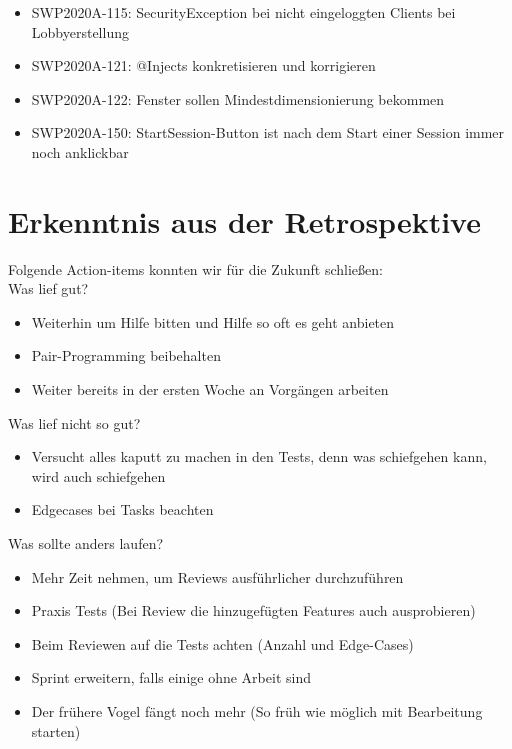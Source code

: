 \documentclass[12pt,a4paper, oneside]{article}
\begin{document}
    \begin{itemize}
        \item SWP2020A-115: SecurityException bei nicht eingeloggten Clients bei Lobbyerstellung
        \item SWP2020A-121: @Injects konkretisieren und korrigieren
        \item SWP2020A-122: Fenster sollen Mindestdimensionierung bekommen
        \item SWP2020A-150: StartSession-Button ist nach dem Start einer Session immer noch anklickbar
    \end{itemize}


    \section{Erkenntnis aus der Retrospektive}
    Folgende Action-items konnten wir für die Zukunft schließen:\\

    Was lief gut?
    \begin{itemize}
        \item Weiterhin um Hilfe bitten und Hilfe so oft es geht anbieten
        \item Pair-Programming beibehalten
        \item Weiter bereits in der ersten Woche an Vorgängen arbeiten
        \\
    \end{itemize}

    Was lief nicht so gut?
    \begin{itemize}
        \item Versucht alles kaputt zu machen in den Tests, denn was schiefgehen kann, wird auch schiefgehen
        \item Edgecases bei Tasks beachten
        \\
    \end{itemize}

    Was sollte anders laufen?
    \begin{itemize}
        \item Mehr Zeit nehmen, um Reviews ausführlicher durchzuführen
        \item Praxis Tests (Bei Review die hinzugefügten Features auch ausprobieren)
        \item Beim Reviewen auf die Tests achten (Anzahl und Edge-Cases)
        \item Sprint erweitern, falls einige ohne Arbeit sind
        \item Der frühere Vogel fängt noch mehr (So früh wie möglich mit Bearbeitung starten)
    \end{itemize}
\end{document}
